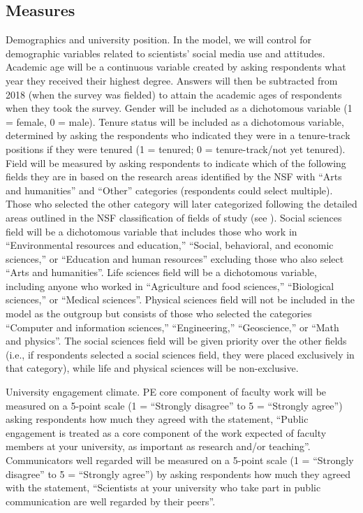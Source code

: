 \documentclass[12pt,]{article}
\begin{document}
\hypertarget{measures}{%
\subsection{Measures}\label{measures}}

Demographics and university position. In the model, we will control for demographic variables related to scientists' social media use and attitudes. Academic age will be a continuous variable created by asking respondents what year they received their highest degree. Answers will then be subtracted from 2018 (when the survey was fielded) to attain the academic ages of respondents when they took the survey. Gender will be included as a dichotomous variable (1 = female, 0 = male). Tenure status will be included as a dichotomous variable, determined by asking the respondents who indicated they were in a tenure-track positions if they were tenured (1 = tenured; 0 = tenure-track/not yet tenured). Field will be measured by asking respondents to indicate which of the following fields they are in based on the research areas identified by the NSF with ``Arts and humanities'' and ``Other'' categories (respondents could select multiple). Those who selected the other category will later categorized following the detailed areas outlined in the NSF classification of fields of study (see \textcite{nsb2018science}). Social sciences field will be a dichotomous variable that includes those who work in ``Environmental resources and education,'' ``Social, behavioral, and economic sciences,'' or ``Education and human resources'' excluding those who also select ``Arts and humanities''. Life sciences field will be a dichotomous variable, including anyone who worked in ``Agriculture and food sciences,'' ``Biological sciences,'' or ``Medical sciences''. Physical sciences field will not be included in the model as the outgroup but consists of those who selected the categories ``Computer and information sciences,'' ``Engineering,'' ``Geoscience,'' or ``Math and physics''. The social sciences field will be given priority over the other fields (i.e., if respondents selected a social sciences field, they were placed exclusively in that category), while life and physical sciences will be non-exclusive.

University engagement climate. PE core component of faculty work will be measured on a 5-point scale (1 = ``Strongly disagree'' to 5 = ``Strongly agree'') asking respondents how much they agreed with the statement, ``Public engagement is treated as a core component of the work expected of faculty members at your university, as important as research and/or teaching''. Communicators well regarded will be measured on a 5-point scale (1 = ``Strongly disagree'' to 5 = ``Strongly agree'') by asking respondents how much they agreed with the statement, ``Scientists at your university who take part in public communication are well regarded by their peers''.
\end{document}
